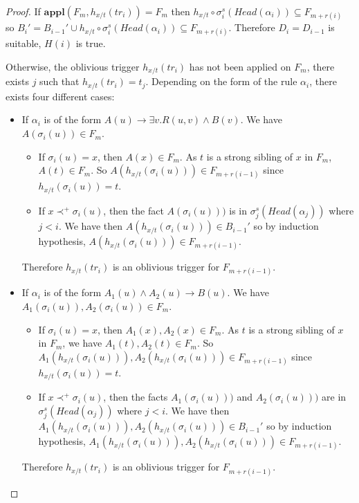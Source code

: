 \documentclass{article}
\theoremstyle{definition}
\theoremstyle{remark}
\newcommand{\Appl}{\textbf{appl}}
\begin{document}
\begin{proof}
If $\Appl(F_{m},h_{x/t}(tr_{i})) = F_{m}$ then $h_{x/t} \circ \sigma_i^s(Head(\alpha_i)) \subseteq F_{m+r(i)}$ so $B_i' = B_{i-1}' \cup h_{x/t} \circ \sigma_i^s(Head(\alpha_i)) 	\subseteq F_{m+r(i)}$. Therefore $D_i = D_{i-1}$ is suitable, $H(i)$ is true.

Otherwise, the oblivious trigger $h_{x/t}(tr_{i})$ has not been applied on $F_{m}$, there exists $j$ such that $h_{x/t}(tr_{i}) = t_j$. Depending on the form of the rule $\alpha_i$, there exists four different cases:
	\begin{itemize}
	\item If $\alpha_i$ is of the form $A(u) \rightarrow \exists v.R(u,v) \wedge B(v)$. We have $A(\sigma_i(u)) \in F_m$.
		\begin{itemize}
		\item If $\sigma_i(u) = x$, then $A(x) \in F_m$. As $t$ is a strong sibling of $x$ in $F_m$, $A(t) \in F_m$. So $A(h_{x/t}(\sigma_i(u))) \in F_{m+r(i-1)}$ since $h_{x/t}(\sigma_i(u)) = t$.  
		\item If $x \prec^+ \sigma_i(u)$, then the fact $A(\sigma_i(u)))$ is in $\sigma_j^s(Head(\alpha_j))$ where $j<i$. We have then $A(h_{x/t}(\sigma_i(u)))\in B_{i-1}'$ so by induction hypothesis, $A(h_{x/t}(\sigma_i(u)))\in F_{m+r(i-1)}$. 
		\end{itemize}
Therefore $h_{x/t}(tr_{i})$ is an oblivious trigger for $F_{m+r(i-1)}$.

	\item If $\alpha_i$ is of the form $A_1(u) \wedge A_2(u) \rightarrow B(u)$. We have $A_1(\sigma_i(u)),A_2(\sigma_i(u)) \in F_m$.
		\begin{itemize}
		\item If $\sigma_i(u) = x$, then $A_1(x),A_2(x) \in F_m$. As $t$ is a strong sibling of $x$ in $F_m$, we have $A_1(t),A_2(t) \in F_m$. So $A_1(h_{x/t}(\sigma_i(u))),A_2(h_{x/t}(\sigma_i(u))) \in F_{m+r(i-1)}$ since $h_{x/t}(\sigma_i(u)) = t$.  
		\item If $x \prec^+ \sigma_i(u)$, then the facts $A_1(\sigma_i(u)))$ and $A_2(\sigma_i(u)))$ are in $\sigma_j^s(Head(\alpha_j))$ where $j<i$. We have then $A_1(h_{x/t}(\sigma_i(u))),A_2(h_{x/t}(\sigma_i(u)))\in B_{i-1}'$ so by induction hypothesis, $A_1(h_{x/t}(\sigma_i(u))),A_2(h_{x/t}(\sigma_i(u)))\in F_{m+r(i-1)}$. 
		\end{itemize}
Therefore $h_{x/t}(tr_{i})$ is an oblivious trigger for $F_{m+r(i-1)}$.  


\end{itemize}
\end{proof}
\end{document}
